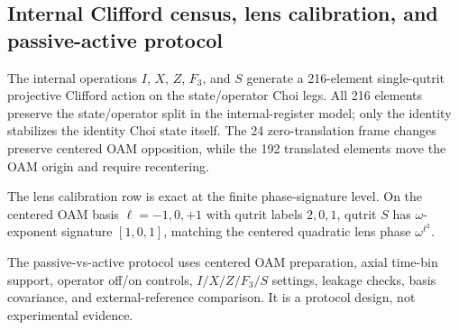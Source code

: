 \subsection{Internal Clifford census, lens calibration, and passive-active protocol}
\label{sec:bt1570-bt1572-internal-clifford-lens-protocol}

The internal operations $I$, $X$, $Z$, $F_3$, and $S$ generate a 216-element single-qutrit projective Clifford action on the state/operator Choi legs.  All 216 elements preserve the state/operator split in the internal-register model; only the identity stabilizes the identity Choi state itself.  The 24 zero-translation frame changes preserve centered OAM opposition, while the 192 translated elements move the OAM origin and require recentering.

The lens calibration row is exact at the finite phase-signature level.  On the centered OAM basis $\ell=-1,0,+1$ with qutrit labels $2,0,1$, qutrit $S$ has $\omega$-exponent signature $[1,0,1]$, matching the centered quadratic lens phase $\omega^{\ell^2}$.

The passive-vs-active protocol uses centered OAM preparation, axial time-bin support, operator off/on controls, $I/X/Z/F_3/S$ settings, leakage checks, basis covariance, and external-reference comparison.  It is a protocol design, not experimental evidence.
